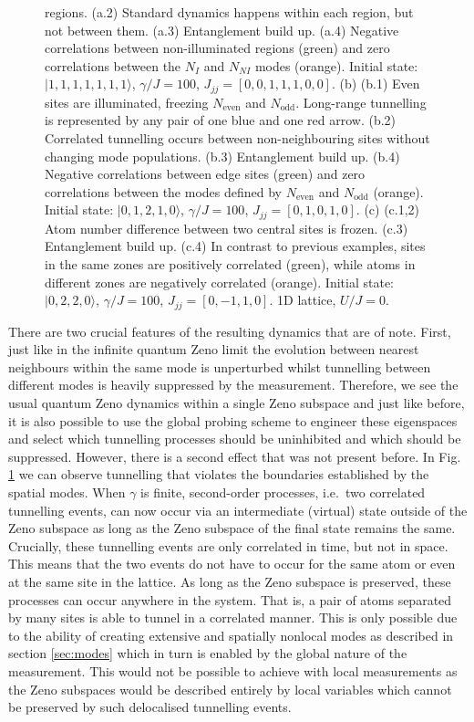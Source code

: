 \begin{figure}[hbtp!]
{    regions. (a.2) Standard dynamics happens within each region, but
    not between them. (a.3) Entanglement build up. (a.4) Negative
    correlations between non-illuminated regions (green) and zero
    correlations between the $N_I$ and $N_{NI}$ modes
    (orange). Initial state: $|1,1,1,1,1,1,1 \rangle$, $\gamma/J=100$,
    $J_{jj}=[0,0,1,1,1,0,0]$.  (b) (b.1) Even sites are illuminated,
    freezing $N_\text{even}$ and $N_\text{odd}$. Long-range tunnelling
    is represented by any pair of one blue and one red arrow. (b.2)
    Correlated tunnelling occurs between non-neighbouring sites without
    changing mode populations. (b.3) Entanglement build up. (b.4)
    Negative correlations between edge sites (green) and zero
    correlations between the modes defined by $N_\text{even}$ and
    $N_\text{odd}$ (orange). Initial state: $|0,1,2,1,0 \rangle$,
    $\gamma/J=100$, $J_{jj}=[0,1,0,1,0]$.  (c) (c.1,2) Atom number
    difference between two central sites is frozen. (c.3) Entanglement
    build up. (c.4) In contrast to previous examples, sites in the
    same zones are positively correlated (green), while atoms in
    different zones are negatively correlated (orange). Initial state:
    $|0,2,2,0 \rangle$, $\gamma/J=100$, $J_{jj}=[0,-1,1,0]$. 1D
    lattice, $U/J=0$.}
  \label{fig:zeno}
\end{figure}

There are two crucial features of the resulting dynamics that are of
note. First, just like in the infinite quantum Zeno limit the
evolution between nearest neighbours within the same mode is
unperturbed whilst tunnelling between different modes is heavily
suppressed by the measurement. Therefore, we see the usual quantum
Zeno dynamics within a single Zeno subspace and just like before, it
is also possible to use the global probing scheme to engineer these
eigenspaces and select which tunnelling processes should be
uninhibited and which should be suppressed. However, there is a second
effect that was not present before. In Fig. \ref{fig:zeno} we can
observe tunnelling that violates the boundaries established by the
spatial modes. When $\gamma$ is finite, second-order processes,
i.e.~two correlated tunnelling events, can now occur via an
intermediate (virtual) state outside of the Zeno subspace as long as
the Zeno subspace of the final state remains the same. Crucially,
these tunnelling events are only correlated in time, but not in
space. This means that the two events do not have to occur for the
same atom or even at the same site in the lattice. As long as the Zeno
subspace is preserved, these processes can occur anywhere in the
system. That is, a pair of atoms separated by many sites is able to
tunnel in a correlated manner. This is only possible due to the
ability of creating extensive and spatially nonlocal modes as
described in section \ref{sec:modes} which in turn is enabled by the
global nature of the measurement. This would not be possible to
achieve with local measurements as the Zeno subspaces would be
described entirely by local variables which cannot be preserved by
such delocalised tunnelling events.

